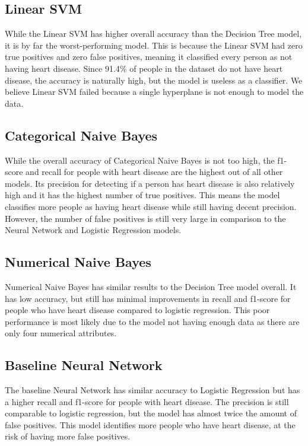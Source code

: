 \documentclass[a4paper]{article}
\begin{document}
\subsection{Linear SVM}

While the Linear SVM has higher overall accuracy than the Decision Tree model, it is by far the worst-performing model. This is because the Linear SVM had zero true positives and zero false positives, meaning it classified every person as not having heart disease. Since 91.4\% of people in the dataset do not have heart disease, the accuracy is naturally high, but the model is useless as a classifier. We believe Linear SVM failed because a single hyperplane is not enough to model the data.


\subsection{Categorical Naive Bayes}

While the overall accuracy of Categorical Naive Bayes is not too high, the f1-score and recall for people with heart disease are the highest out of all other models. Its precision for detecting if a person has heart disease is also relatively high and it has the highest number of true positives. This means the model classifies more people as having heart disease while still having decent precision. However, the number of false positives is still very large in comparison to the Neural Network and Logistic Regression models.

\subsection{Numerical Naive Bayes}

Numerical Naive Bayes has similar results to the Decision Tree model overall. It has low accuracy, but still has minimal improvements in recall and f1-score for people who have heart disease compared to logistic regression. This poor performance is most likely due to the model not having enough data as there are only four numerical attributes.


\subsection{Baseline Neural Network}

The baseline Neural Network has similar accuracy to Logistic Regression but has a higher recall and f1-score for people with heart disease. The precision is still comparable to logistic regression, but the model has almost twice the amount of false positives. This model identifies more people who have heart disease, at the risk of having more false positives.  
	
\end{document}
